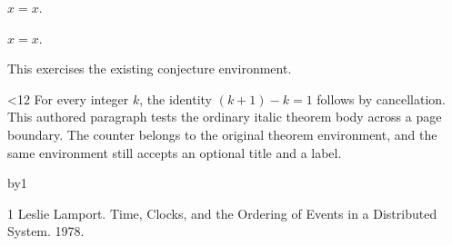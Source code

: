 \documentclass[11pt,twoside]{article}
\begin{document}
\begin{proposition}[Identity]$x=x$.\end{proposition}
\begin{corollary}[Identity]$x=x$.\end{corollary}
\begin{conjecture}[Fixture]This exercises the existing conjecture environment.\end{conjecture}
\begin{theorem}\label{lab:ordinary-long}
\loop\ifnum\labloop<12
For every integer $k$, the identity $(k+1)-k=1$ follows by cancellation.
This authored paragraph tests the ordinary italic theorem body across a page
boundary. The counter belongs to the original theorem environment, and the
same environment still accepts an optional title and a label.\par
\advance\labloop by1\repeat
\end{theorem}
\begin{thebibliography}{1}
Leslie Lamport. Time, Clocks, and the Ordering of Events in a Distributed System. 1978.\par
\end{thebibliography}
\clearpage
\end{document}
